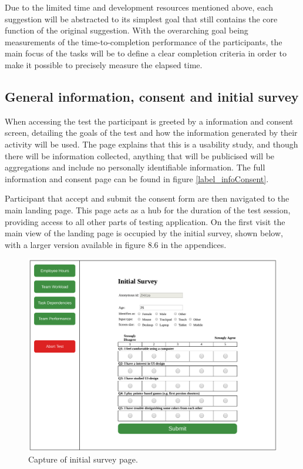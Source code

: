 {  Due to the limited time and development resources mentioned above, each
  suggestion will be abstracted to its simplest goal that still contains
  the core function of the original suggestion. With the overarching goal being
  measurements of the time-to-completion performance of the participants, the
  main focus of the tasks will be to define a clear completion criteria in
  order to make it possible to precisely measure the elapsed time.

  \subsection{General information, consent and initial survey}

  When accessing the test the participant is greeted by a information and
  consent screen, detailing the goals of the test and how the information
  generated by their activity will be used. The page explains that this
  is a usability study, and though there will be information collected,
  anything that will be publicised will be aggregations and include no
  personally identifiable information. The full information and consent
  page can be found in figure \ref{label_infoConsent}.

  Participant that accept and submit the consent form are then navigated
  to the main landing page. This page acts as a hub for the duration of
  the test session, providing access to all other parts of testing
  application. On the first visit the main view of the landing page is
  occupied by the initial survey, shown below, with a larger version available
  in figure 8.6 in the appendices.

  \begin{figure}[h!]
    \centering
    \includegraphics[width=.65\textwidth]{figures/captures/webapp_pre_survey.pdf}
    \caption{Capture of initial survey page.}
    \label{label_preSurvey}
  \end{figure}

}
